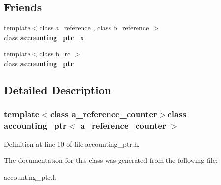 \subsection*{Friends}
\begin{DoxyCompactItemize}
\item 
{\footnotesize template$<$class a\-\_\-reference , class b\-\_\-reference $>$ }\\class {\bfseries accounting\-\_\-ptr\-\_\-x}\label{classaccounting__ptr_af4f9f53fa1051f8fcb513d43b9e1b539}

\item 
{\footnotesize template$<$class b\-\_\-rc $>$ }\\class {\bfseries accounting\-\_\-ptr}\label{classaccounting__ptr_a5548f94da6403f2c9c5144a964cf89f0}

\end{DoxyCompactItemize}


\subsection{Detailed Description}
\subsubsection*{template$<$class a\-\_\-reference\-\_\-counter$>$class accounting\-\_\-ptr$<$ a\-\_\-reference\-\_\-counter $>$}



Definition at line 10 of file accounting\-\_\-ptr.\-h.



The documentation for this class was generated from the following file\-:\begin{DoxyCompactItemize}
\item 
accounting\-\_\-ptr.\-h\end{DoxyCompactItemize}
